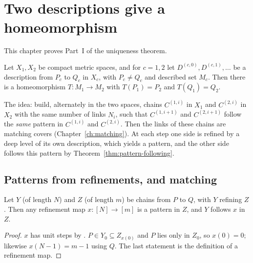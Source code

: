\chapter{Two descriptions give a homeomorphism}\label{ch:two}

This chapter proves Part~I of the uniqueness theorem.

\begin{theorem}\label{thm:two-desc}
Let $X_1,X_2$ be compact metric spaces, and for $c=1,2$ let $D^{(c,0)},D^{(c,1)},\dots$ be a description from $P_c$ to $Q_c$ in
$X_c$, with $P_c\neq Q_c$ and described set $M_c$. Then there is a homeomorphism $T\colon M_1\to M_2$ with $T(P_1)=P_2$ and
$T(Q_1)=Q_2$.
\end{theorem}


The idea: build, alternately in the two spaces, chains $C^{(1,i)}$ in $X_1$ and $C^{(2,i)}$ in $X_2$ with the same number of links
$N_i$, such that $C^{(1,i+1)}$ and $C^{(2,i+1)}$ follow the \emph{same} pattern in $C^{(1,i)}$ and $C^{(2,i)}$. Then the links of
these chains are matching covers (Chapter~\ref{ch:matching}). At each step one side is refined by a deep level of its own
description, which yields a pattern, and the other side follows this pattern by Theorem~\ref{thm:pattern-following}.

\section{Patterns from refinements, and matching}

\begin{lemma}\label{lem:pattern-of-refines}
Let $Y$ (of length $N$) and $Z$ (of length $m$) be chains from $P$ to $Q$, with $Y$ refining $Z$. Then any refinement map
$x\colon[N]\to[m]$ is a pattern in $Z$, and $Y$ follows $x$ in $Z$.
\end{lemma}

\begin{proof}
$x$ has unit steps by . $P\in Y_0\subseteq Z_{x(0)}$ and $P$ lies only in $Z_0$, so $x(0)=0$; likewise
$x(N-1)=m-1$ using $Q$. The last statement is the definition of a refinement map.
\end{proof}


